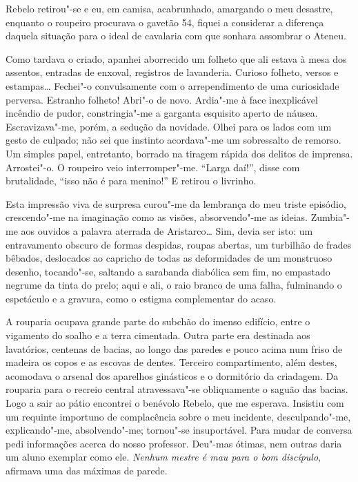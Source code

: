 Rebelo retirou"-se e eu, em camisa, acabrunhado, amargando o meu desastre,
enquanto o roupeiro procurava o gavetão 54, fiquei a considerar a
diferença daquela situação para o ideal de cavalaria com que sonhara
assombrar o Ateneu. 

Como tardava o criado, apanhei aborrecido um
folheto que ali estava à mesa dos assentos, entradas de enxoval,
registros de lavanderia. Curioso folheto, versos e estampas\ldots{}
Fechei"-o convulsamente com o arrependimento de uma curiosidade
perversa. Estranho folheto! Abri"-o de novo. Ardia"-me à face
inexplicável incêndio de pudor, constringia"-me a garganta esquisito
aperto de náusea. Escravizava"-me, porém, a sedução da novidade. Olhei
para os lados com um gesto de culpado; não sei que instinto
acordava"-me um sobressalto de remorso. Um simples papel, entretanto,
borrado na tiragem rápida dos delitos de imprensa. Arrostei"-o. O
roupeiro veio interromper"-me. ``Larga daí!'', disse com brutalidade, 
``isso não é para menino!'' E retirou o livrinho. 

Esta impressão viva de
surpresa curou"-me da lembrança do meu triste episódio, crescendo"-me
na imaginação como as visões, absorvendo"-me as ideias. Zumbia"-me
aos ouvidos a palavra aterrada de Aristarco\ldots{} Sim, devia ser isto: um
entravamento obscuro de formas despidas, roupas abertas, um turbilhão
de frades bêbados, deslocados ao capricho de todas as deformidades de
um monstruoso desenho, tocando"-se, saltando a sarabanda diabólica sem
fim, no empastado negrume da tinta do prelo; aqui e ali, o raio branco
de uma falha, fulminando o espetáculo e a gravura, como o estigma
complementar do acaso. 

A rouparia ocupava grande parte do subchão do
imenso edifício, entre o vigamento do soalho e a terra cimentada. Outra
parte era destinada aos lavatórios, centenas de bacias, ao longo das
paredes e pouco acima num friso de madeira os copos e as escovas de
dentes. Terceiro compartimento, além destes, acomodava o arsenal dos
aparelhos ginásticos e o dormitório da criadagem. Da rouparia para o
recreio central atravessava"-se obliquamente o saguão das bacias. Logo
a sair ao pátio encontrei o benévolo Rebelo, que me esperava. Insistiu
com um requinte importuno de complacência sobre o meu incidente,
desculpando"-me, explicando"-me, absolvendo"-me; tornou"-se
insuportável. Para mudar de conversa pedi informações acerca do nosso
professor. Deu"-mas ótimas, nem outras daria um aluno exemplar como
ele. \textit{Nenhum mestre é mau para o bom discípulo}, afirmava 
uma das máximas de parede. 

